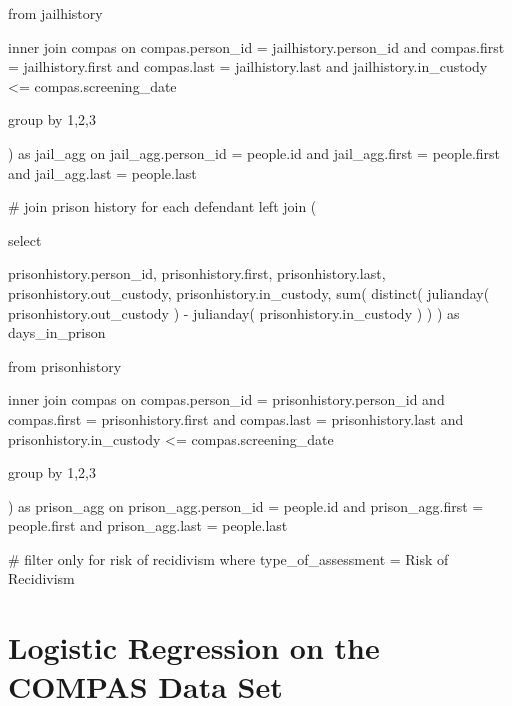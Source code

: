 \documentclass[12pt, twoside]{amherstthesis}
\newenvironment{Shaded}{\begin{snugshade}}{\end{snugshade}}
\newcommand{\NormalTok}[1]{#1}
\begin{document}
\begin{Shaded}
\begin{Highlighting}[]
\NormalTok{from jailhistory}
    
\NormalTok{inner join compas }
\NormalTok{on compas.person\_id = jailhistory.person\_id}
\NormalTok{and compas.first = jailhistory.first}
\NormalTok{and compas.last = jailhistory.last}
\NormalTok{and jailhistory.in\_custody \textless{}= compas.screening\_date}
    
\NormalTok{group by 1,2,3}
    
\NormalTok{) as jail\_agg }
\NormalTok{on jail\_agg.person\_id = people.id}
\NormalTok{and jail\_agg.first = people.first}
\NormalTok{and jail\_agg.last = people.last}

\NormalTok{\# join prison history for each defendant}
\NormalTok{left join  (}

\NormalTok{select }

\NormalTok{prisonhistory.person\_id,}
\NormalTok{prisonhistory.first,}
\NormalTok{prisonhistory.last,}
\NormalTok{prisonhistory.out\_custody,}
\NormalTok{prisonhistory.in\_custody,}
\NormalTok{sum(}
\NormalTok{  distinct(}
\NormalTok{    julianday(}
\NormalTok{      prisonhistory.out\_custody}
\NormalTok{      ) {-} julianday(}
\NormalTok{        prisonhistory.in\_custody}
\NormalTok{        )}
\NormalTok{    )}
\NormalTok{  ) as days\_in\_prison}

\NormalTok{from prisonhistory}
    
\NormalTok{inner join compas }
\NormalTok{on compas.person\_id = prisonhistory.person\_id}
\NormalTok{and compas.first = prisonhistory.first}
\NormalTok{and compas.last = prisonhistory.last}
\NormalTok{and prisonhistory.in\_custody \textless{}= compas.screening\_date}
    
\NormalTok{group by 1,2,3}
    
\NormalTok{) as prison\_agg }
\NormalTok{on prison\_agg.person\_id = people.id}
\NormalTok{and prison\_agg.first = people.first}
\NormalTok{and prison\_agg.last = people.last}

\NormalTok{\# filter only for risk of recidivism}
\NormalTok{where type\_of\_assessment = \textquotesingle{}Risk of Recidivism\textquotesingle{}}
\end{Highlighting}
\end{Shaded}
\hypertarget{appendix-d}{%
\chapter{Logistic Regression on the COMPAS Data Set}\label{appendix-d}}
\end{document}
